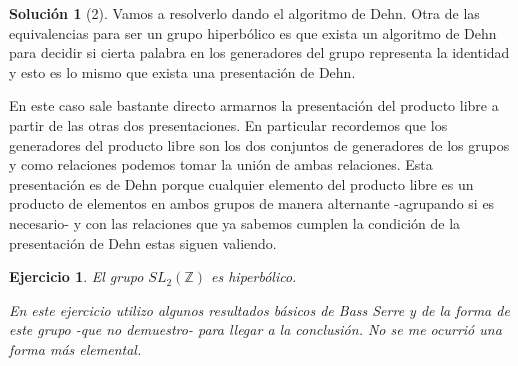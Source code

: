 \documentclass[12pt]{article}
\theoremstyle{plain}
\newtheorem*{ej}{Ejercicio}
\theoremstyle{definition}
\newtheorem*{sol}{Solución}
\theoremstyle{remark}
\newcommand\ZZ{\mathbb{Z}}
\begin{document}
\bigskip
\begin{sol}[2]
	Vamos a resolverlo dando el algoritmo de Dehn. Otra de las equivalencias para ser un grupo hiperbólico es que exista un algoritmo de Dehn para decidir si cierta palabra en los generadores del grupo representa la identidad y esto es lo mismo que exista una presentación de Dehn. 
	
	En este caso sale bastante directo armarnos la presentación del producto libre a partir de las otras dos presentaciones. En particular recordemos que los generadores del producto libre son los dos conjuntos de generadores de los grupos y como relaciones podemos tomar la unión de ambas relaciones. Esta presentación es de Dehn porque cualquier elemento del producto libre es un producto de elementos en ambos grupos de manera alternante -agrupando si es necesario- y con las relaciones que ya sabemos cumplen la condición de la presentación de Dehn estas siguen valiendo.
\end{sol}	
	
\newpage
\begin{tcolorbox}[colback=teal!25!white,colframe=teal!75!black]
	\begin{ej}
		El grupo $SL_2 (\ZZ)$ es hiperbólico.
	\end{ej}	
\end{tcolorbox}
\medskip	

\emph{En este ejercicio utilizo algunos resultados básicos de Bass Serre y de la forma de este grupo -que no demuestro- para llegar a la conclusión. No se me ocurrió una forma más elemental.}
\end{document}
